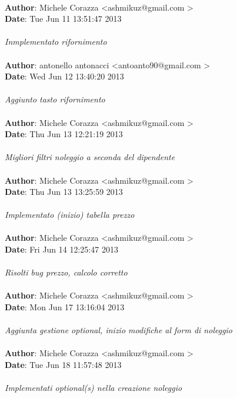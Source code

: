 \documentclass[a4paper,12pt]{article} %
\begin{document}
\\
\textbf{Author}: Michele Corazza \textless ashmikuz@gmail.com \textgreater \\
\textbf{Date}:   Tue Jun 11 13:51:47 2013 \\
\\
    \emph{Inmplementato rifornimento}\\
\\
\textbf{Author}: antonello antonacci \textless antoanto90@gmail.com \textgreater \\
\textbf{Date}:   Wed Jun 12 13:40:20 2013 \\
\\
    \emph{Aggiunto tasto rifornimento}\\
\\
\textbf{Author}: Michele Corazza \textless ashmikuz@gmail.com \textgreater \\
\textbf{Date}:   Thu Jun 13 12:21:19 2013 \\
\\
    \emph{Migliori filtri noleggio a seconda del dipendente}\\
\\
\textbf{Author}: Michele Corazza \textless ashmikuz@gmail.com \textgreater \\
\textbf{Date}:   Thu Jun 13 13:25:59 2013 \\
\\
    \emph{Implementato (inizio) tabella prezzo}\\
\\
\textbf{Author}: Michele Corazza \textless ashmikuz@gmail.com \textgreater \\
\textbf{Date}:   Fri Jun 14 12:25:47 2013 \\
\\
    \emph{Risolti bug prezzo, calcolo corretto}\\
\\
\textbf{Author}: Michele Corazza \textless ashmikuz@gmail.com \textgreater \\
\textbf{Date}:   Mon Jun 17 13:16:04 2013 \\
\\
    \emph{Aggiunta gestione optional, inizio modifiche al form di noleggio}\\
\\
\textbf{Author}: Michele Corazza \textless ashmikuz@gmail.com \textgreater \\
\textbf{Date}:   Tue Jun 18 11:57:48 2013 \\
\\
    \emph{Implementati optional(s) nella creazione noleggio}\\
\end{document}
